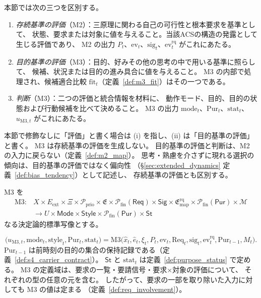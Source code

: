 \begin{definition}
\label{def:eval_vs_judgment}
本節では次の三つを区別する。
\begin{enumerate}[label=(\roman*)]
  \item \emph{存続基準の評価}（M2）：三原理に関わる自己の可行性と根本要求を基準として、
  状態、要求または対象に値を与えること。当該ACSの構造の発露として生じる評価であり、
  M2 の出力 $P_t$、$\mathrm{ev}_t$、$\mathrm{sig}_t$、$\mathrm{ev}^{\mathrm{rq}}_t$ がこれにあたる。
  \item \emph{目的基準の評価}（M3）：目的、好みその他の思考の中で用いる基準に照らして、
  候補、状況または目的の進み具合に値を与えること。
  M3 の内部で処理され、候補適合比較 $\mathrm{fit}_t$（定義~\ref{def:m3_fit}）はその一つである。
  \item \emph{判断}（M3）：二つの評価と統合情報を材料に、
  動作モード、目的、目的の状態および行動候補を比べて決めること。
  M3 の出力 $\mathrm{mode}_t$、$\mathrm{Pur}_t$、$\mathrm{stat}_t$、$u_{\mathrm{M3},t}$ がこれにあたる。
\end{enumerate}
本節で修飾なしに「評価」と書く場合は (i) を指し、(ii) は「目的基準の評価」と書く。
M3 は存続基準の評価を生成しない。
目的基準の評価と判断は、M2 の入力に戻らない（定義~\ref{def:m2_map}）。
思考・熟慮を介さずに現れる選択の傾向は、目的基準の評価ではなく偏向性
（\S\ref{sec:extended_dynamics} 定義~\ref{def:bias_tendency}）として記述し、
存続基準の評価とも区別する。
\end{definition}

\begin{definition}
\label{def:m3_map}
M3 を
\[
\begin{aligned}
\mathrm{M3}:&
X\times E_{\mathrm{ext}}\times\Xi
\times\mathcal P_{\mathrm{prio}}\times\mathfrak E
\times\mathcal P_{\mathrm{fin}}(\mathsf{Req})\times\mathsf{Sig}\times\mathfrak E^{\mathrm{rq}}_{\mathrm{map}}
\times\mathcal P_{\mathrm{fin}}(\mathsf{Pur})\times\mathcal M
\\
&\to
U\times\mathsf{Mode}\times\mathsf{Style}\times\mathcal P_{\mathrm{fin}}(\mathsf{Pur})\times\mathsf{St}
\end{aligned}
\]
なる決定論的標準写像とする。

\[
  \bigl(
    u_{\mathrm{M3},t},
    \mathrm{mode}_t,
    \mathrm{style}_t,
    \mathrm{Pur}_t,
    \mathrm{stat}_t
  \bigr)
  =
  \mathrm{M3}
  \bigl(
    \hat x_t,\hat e_t,\xi_t,
    P_t,\mathrm{ev}_t,
    \mathrm{Req}_t,\mathrm{sig}_t,\mathrm{ev}^{\mathrm{rq}}_t,\mathrm{Pur}_{t-1},M_t
  \bigr).
\]
$\mathrm{Pur}_{t-1}$ は前時刻の目的の集合の保持記録である（定義~\ref{def:s4_carrier_contract}）。
$\mathsf{St}$ と $\mathrm{stat}_t$ は定義~\ref{def:purpose_status} で定める。
M3 の定義域は、要求の一覧・要請信号・要求×対象の評価について、
それぞれの型の任意の元を含む。
したがって、要求の一部を取り除いた入力に対しても M3 の値は定まる
（定義~\ref{def:req_involvement}）。
\end{definition}

